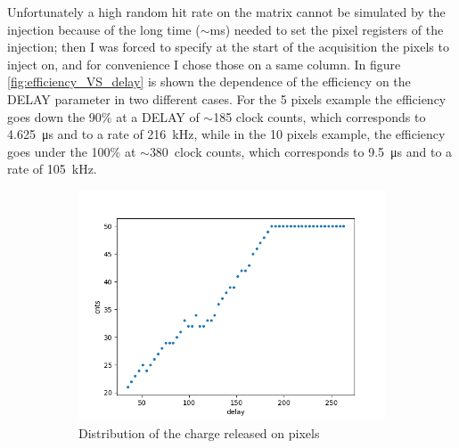         Unfortunately a high random hit rate on the matrix cannot be simulated by the injection because of the long time ($\sim$\si{ms}) needed to set the pixel registers of the injection; then I was forced to specify at the start of the acquisition the pixels to inject on, and for convenience I chose those on a same column.  
        In figure \ref{fig:efficiency_VS_delay} is shown the dependence of the efficiency on the DELAY parameter in two different cases. 
        For the 5 pixels example the efficiency goes down the 90\% at a DELAY of $\sim$185 clock counts, which corresponds to \SI{4.625}{\us} and to a rate of \SI{216}{kHz}, while in the 10 pixels example, the efficiency goes under the 100\% at $\sim$\SI{380}{clock} counts, which corresponds to \SI{9.5}{\us} and to a rate of \SI{105}{kHz}. 
        \begin{figure}
            \centering
            \begin{subfigure}[b]{0.49\textwidth}
                \centering
                \includegraphics[width=\linewidth]{figures/charaterization/efficiency_5pixels.png}
                \caption{Distribution of the charge released on pixels}
                \label{fig:efficiency_5_pixels}
            \end{subfigure}
            \hfill
            \begin{subfigure}[b]{0.49\textwidth}
                \centering

\end{subfigure}
\end{figure}
